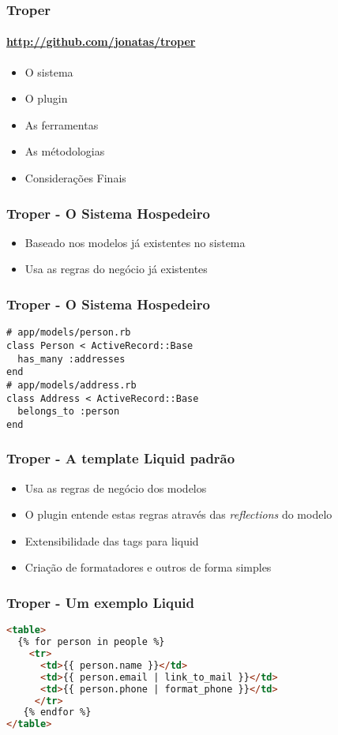\documentclass{beamer}
\begin{document}
 
\begin{frame} 
\frametitle{Troper} 
\framesubtitle{\url{http://github.com/jonatas/troper}}
\begin{itemize} 
\item O sistema
\item O plugin
\item As ferramentas 
\item As métodologias
\item Considerações Finais
\end{itemize} 
\end{frame} 

\begin{frame} 
\frametitle{Troper - O Sistema Hospedeiro} 
\begin{itemize} 
  \item Baseado nos modelos já existentes no sistema
  \item Usa as regras do negócio já existentes
\end{itemize} 
\end{frame} 

\begin{frame}[fragile]
\frametitle{Troper - O Sistema Hospedeiro} 
\begin{lstlisting}[caption=Modelo ActiveRecord]
# app/models/person.rb
class Person < ActiveRecord::Base
  has_many :addresses
end
# app/models/address.rb
class Address < ActiveRecord::Base
  belongs_to :person 
end
\end{lstlisting}
\end{frame}

\begin{frame} 
\frametitle{Troper - A template Liquid padrão } 
\begin{itemize} 
  \item Usa as regras de negócio dos modelos
  \item O plugin entende estas regras através das \textit{reflections} do modelo
  \item Extensibilidade das tags para liquid
  \item Criação de formatadores e outros de forma simples 
\end{itemize} 
\end{frame} 

\begin{frame}[fragile]
\frametitle{Troper - Um exemplo Liquid} 
\begin{lstlisting}[language=html, caption=Template do Liquid]
<table>
  {% for person in people %}
    <tr>
      <td>{{ person.name }}</td>
      <td>{{ person.email | link_to_mail }}</td>
      <td>{{ person.phone | format_phone }}</td>
     </tr>
   {% endfor %}      
</table>
\end{lstlisting}
\end{frame}
\end{document}
